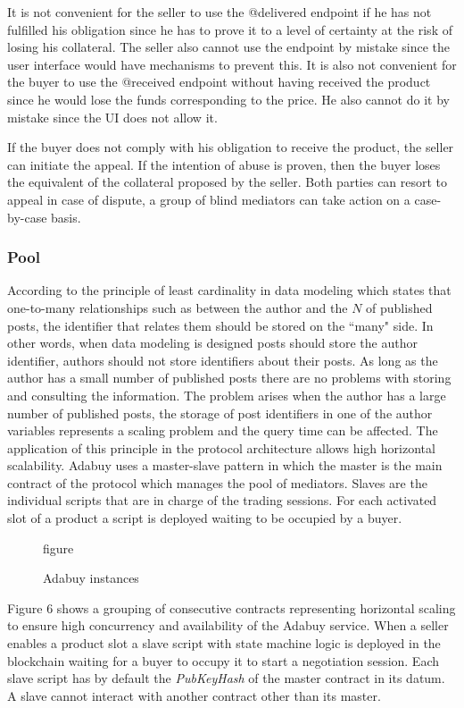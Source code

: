 \documentclass[12pt]{article}
\begin{document}
It is not convenient for the seller to use the @delivered endpoint if he has not fulfilled his obligation since he has to prove it to a level of certainty at the risk of losing his collateral. The seller also cannot use the endpoint by mistake since the user interface would have mechanisms to prevent this. It is also not convenient for the buyer to use the @received endpoint without having received the product since he would lose the funds corresponding to the price. He also cannot do it by mistake since the UI does not allow it.

If the buyer does not comply with his obligation to receive the product, the seller can initiate the appeal. If the intention of abuse is proven, then the buyer loses the equivalent of the collateral proposed by the seller. Both parties can resort to appeal in case of dispute, a group of blind mediators can take action on a case-by-case basis.

\subsubsection { Pool } 

According to the principle of least cardinality in data modeling which states that one-to-many relationships such as between the author and the $N$ of published posts, the identifier that relates them should be stored on the ``many" side. In other words, when data modeling is designed posts should store the author identifier, authors should not store identifiers about their posts. As long as the author has a small number of published posts there are no problems with storing and consulting the information. The problem arises when the author has a large number of published posts, the storage of post identifiers in one of the author variables represents a scaling problem and the query time can be affected.
The application of this principle in the protocol architecture allows high horizontal scalability.
Adabuy uses a master-slave pattern in which the master is the main contract of the protocol which manages the pool of mediators.
Slaves are the individual scripts that are in charge of the trading sessions. For each activated slot of a product a script is deployed waiting to be occupied by a buyer.


\begin{figure}[ht]
  \centering
figure
  \caption{Adabuy instances}
  \label{fig:delivered}
\end{figure}


Figure 6 shows a grouping of consecutive contracts representing horizontal scaling to ensure high concurrency and availability of the Adabuy service.
When a seller enables a product slot a slave script with state machine logic is deployed in the blockchain waiting for a buyer to occupy it to start a negotiation session.
Each slave script has by default the \emph{PubKeyHash} of the master contract in its datum.
A slave cannot interact with another contract other than its master.
\end{document}
